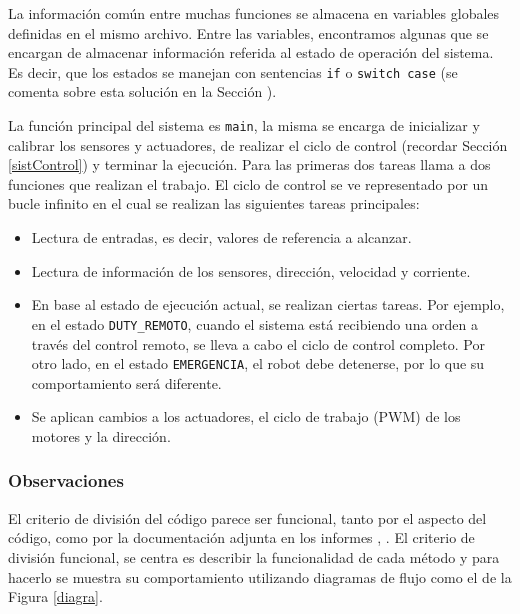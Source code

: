 La información común entre muchas funciones se almacena en variables globales definidas en el mismo archivo. Entre las variables, encontramos algunas que se encargan de almacenar información referida al estado de operación del sistema. Es decir, que los estados se manejan con sentencias \verb|if| o \verb|switch case| (se comenta sobre esta solución en la Sección ).

La función principal del sistema es \verb|main|, la misma se encarga de inicializar y calibrar los sensores y actuadores, de realizar el ciclo de control (recordar Sección \ref{sistControl}) y terminar la ejecución. Para las primeras dos tareas llama a dos funciones que realizan el trabajo. El ciclo de control se ve representado por un bucle infinito en el cual se realizan las siguientes tareas principales:
\begin{itemize}
\item Lectura de entradas, es decir, valores de referencia a alcanzar.
\item Lectura de información de los sensores, dirección, velocidad y corriente.
\item En base al estado de ejecución actual, se realizan ciertas tareas. Por ejemplo, en el estado \verb|DUTY_REMOTO|, cuando el sistema está recibiendo una orden a través del control remoto, se lleva a cabo el ciclo de control completo. Por otro lado, en el estado \verb|EMERGENCIA|, el robot debe detenerse, por lo que su comportamiento será diferente.
\item Se aplican cambios a los actuadores, el ciclo de trabajo (\gls{PWM}) de los motores y la dirección.
\end{itemize}

\subsubsection*{Observaciones}
El criterio de división del código parece ser funcional, tanto por el aspecto del código, como por la documentación adjunta en los informes \cite[pág. 78-85]{disenioViejo1}, \cite[pág. 110-149]{disenioViejo2}. El criterio de división funcional, se centra es describir la funcionalidad de cada método y para hacerlo se muestra su comportamiento utilizando diagramas de flujo como el de la Figura \ref{diagra}. 

